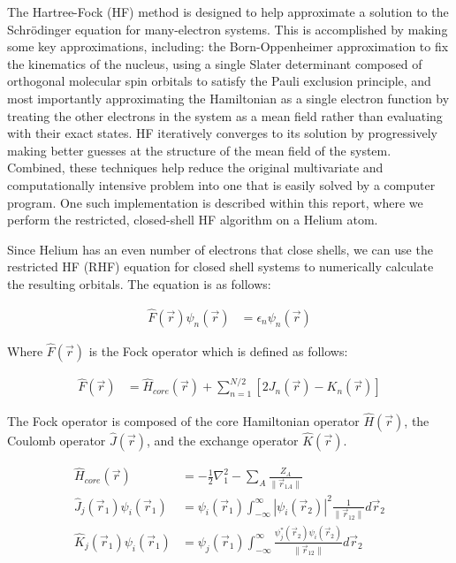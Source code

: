 \documentclass[conference, twoside]{IEEEtran}
\begin{document}
The Hartree-Fock (HF) method \cite{szabo-ostlund} is designed to help approximate a solution to the Schr\"{o}dinger equation for many-electron systems. This is accomplished by making some key approximations, including: the Born-Oppenheimer approximation to fix the kinematics of the nucleus, using a single Slater determinant composed of orthogonal molecular spin orbitals to satisfy the Pauli exclusion principle, and most importantly approximating the Hamiltonian as a single electron function by treating the other electrons in the system as a mean field rather than evaluating with their exact states. HF iteratively converges to its solution by progressively making better guesses at the structure of the mean field of the system. Combined, these techniques help reduce the original multivariate and computationally intensive problem into one that is easily solved by a computer program. One such implementation is described within this report, where we perform the restricted, closed-shell HF algorithm on a Helium atom.

Since Helium has an even number of electrons that close shells, we can use the restricted HF (RHF) equation for closed shell systems to numerically calculate the resulting orbitals. The equation is as follows:

\begin{align}
  \hat{F}(\vec{r})\psi_n(\vec{r}) &= \epsilon_n\psi_n(\vec{r})
\end{align}

Where $\hat{F}(\vec{r})$ is the Fock operator which is defined as follows:

\begin{align}
  \hat{F}(\vec{r}) &= \hat{H}_{core}(\vec{r}) + \sum_{n=1}^{N/2}\left[2J_n(\vec{r}) - K_n(\vec{r})\right]
\end{align}

The Fock operator is composed of the core Hamiltonian operator $\hat{H}(\vec{r})$, the Coulomb operator $\hat{J}(\vec{r})$, and the exchange operator $\hat{K}(\vec{r})$.

\begin{align}
  \hat{H}_{core}(\vec{r}) &= -\frac{1}{2}\nabla_1^2 - \sum_A\frac{Z_A}{\|\vec{r}_{1 A}\|}\\
  \hat{J}_j(\vec{r}_1)\psi_i(\vec{r}_1) &= \psi_i(\vec{r}_1)\int_{-\infty}^{\infty}\left|\psi_i(\vec{r}_2)\right|^2\frac{1}{\|\vec{r}_{12}\|}d\vec{r}_2 \\
  \hat{K}_j(\vec{r}_1)\psi_i(\vec{r}_1) &= \psi_j(\vec{r}_1)\int_{-\infty}^{\infty}\frac{\psi_j^\ast(\vec{r}_2)\psi_i(\vec{r}_2)}{\|\vec{r}_{12}\|}d\vec{r}_2
\end{align}
\end{document}
